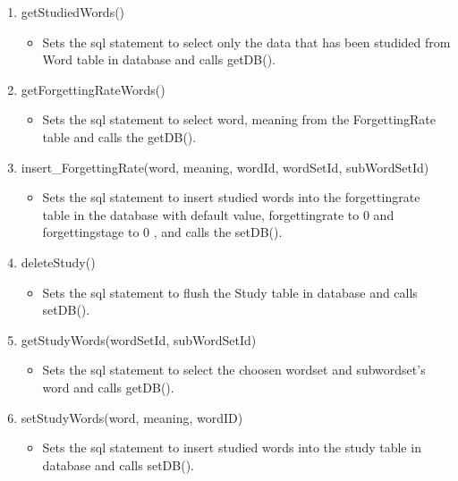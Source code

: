 \documentclass[conference]{IEEEtran}
\begin{document}
\begin{enumerate}
\begin{enumerate}
\begin{enumerate}
\begin{enumerate}
                        \item getStudiedWords()
                            \begin{itemize}
                                \item Sets the sql statement to select only the data that has been studided from Word table in database and calls getDB().
                            \end{itemize}
                        \item getForgettingRateWords()
                            \begin{itemize}
                                \item Sets the sql statement to select word, meaning from the ForgettingRate table and calls the getDB().
                            \end{itemize}
                        \item insert\_ForgettingRate(word, meaning, wordId, wordSetId, subWordSetId)
                            \begin{itemize}
                                \item Sets the sql statement to insert studied words into the forgettingrate table in the database with default value, forgettingrate to 0 and forgettingstage to 0 , and calls the setDB().
                            \end{itemize}
                        \item deleteStudy()
                            \begin{itemize}
                                \item Sets the sql statement to flush the Study table in database and calls setDB().
                            \end{itemize}
                        \item getStudyWords(wordSetId, subWordSetId)
                            \begin{itemize}
                                \item Sets the sql statement to select the choosen wordset and subwordset's word and calls getDB().
                            \end{itemize}
                        \item setStudyWords(word, meaning, wordID)
                            \begin{itemize}
                                \item Sets the sql statement to insert studied words into the study table in database and calls setDB(). 

\end{itemize}
\end{enumerate}
\end{enumerate}
\end{enumerate}
\end{enumerate}
\end{document}
